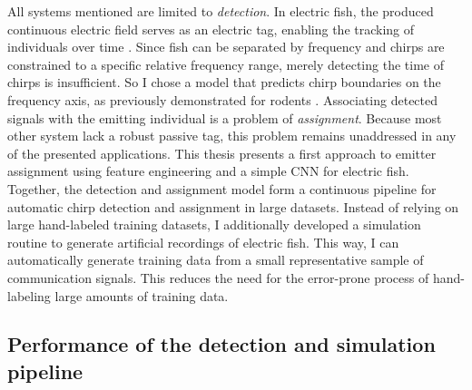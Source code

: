 All systems mentioned are limited to \emph{detection}. In electric fish, the
produced continuous electric field serves as an electric tag, enabling the
tracking of individuals over time \parencite{hagedornCourtSparkElectric1985a,
henningerTrackingActivityPatterns2020,
madhavHighresolutionBehavioralMapping2018,
raabAdvancesNoninvasiveTracking2022}. Since fish can be separated by frequency
and chirps are constrained to a specific relative frequency range, merely
detecting the time of chirps is insufficient. So I chose a model that predicts
chirp boundaries on the frequency axis, as previously demonstrated for rodents
\parencite{coffeyDeepSqueakDeepLearningbased2019}. Associating detected signals
with the emitting individual is a problem of \emph{assignment}. Because most
other system lack a robust passive tag, this problem remains unaddressed in any
of the presented applications. This thesis presents a first approach to emitter
assignment using feature engineering and a simple CNN for electric fish.
Together, the detection and assignment model form a continuous pipeline for
automatic chirp detection and assignment in large datasets. Instead of relying
on large hand-labeled training datasets, I additionally developed a simulation
routine to generate artificial recordings of electric fish. This way, I can
automatically generate training data from a small representative sample of
communication signals. This reduces the need for the error-prone process of
hand-labeling large amounts of training data.

\subsection{Performance of the detection and simulation pipeline}

